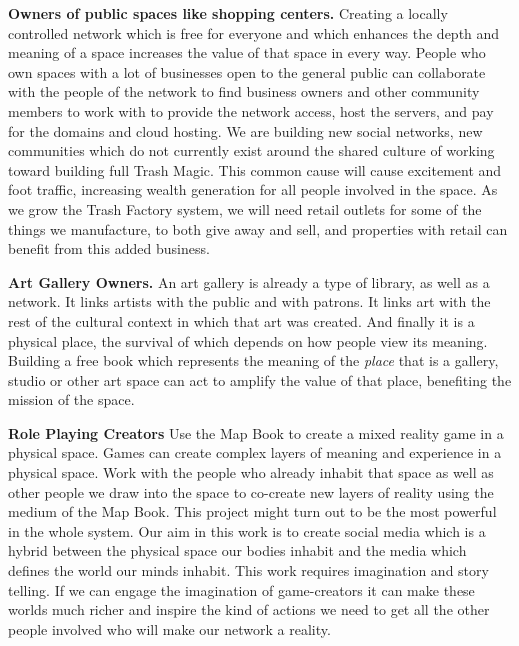 \textbf{Owners of public spaces like shopping centers.} Creating a
locally controlled network which is free for everyone and which enhances
the depth and meaning of a space increases the value of that space in
every way. People who own spaces with a lot of businesses open to the
general public can collaborate with the people of the network to find
business owners and other community members to work with to provide the
network access, host the servers, and pay for the domains and cloud
hosting. We are building new social networks, new communities which do
not currently exist around the shared culture of working toward building
full Trash Magic. This common cause will cause excitement and foot
traffic, increasing wealth generation for all people involved in the
space. As we grow the Trash Factory system, we will need retail outlets
for some of the things we manufacture, to both give away and sell, and
properties with retail can benefit from this added business.

\textbf{Art Gallery Owners.} An art gallery is already a type of
library, as well as a network. It links artists with the public and with
patrons. It links art with the rest of the cultural context in which
that art was created. And finally it is a physical place, the survival
of which depends on how people view its meaning. Building a free book
which represents the meaning of the \emph{place} that is a gallery,
studio or other art space can act to amplify the value of that place,
benefiting the mission of the space.

\textbf{Role Playing Creators} Use the Map Book to create a mixed
reality game in a physical space. Games can create complex layers of
meaning and experience in a physical space. Work with the people who
already inhabit that space as well as other people we draw into the
space to co-create new layers of reality using the medium of the Map
Book. This project might turn out to be the most powerful in the whole
system. Our aim in this work is to create social media which is a hybrid
between the physical space our bodies inhabit and the media which
defines the world our minds inhabit. This work requires imagination and
story telling. If we can engage the imagination of game-creators it can
make these worlds much richer and inspire the kind of actions we need to
get all the other people involved who will make our network a reality.
